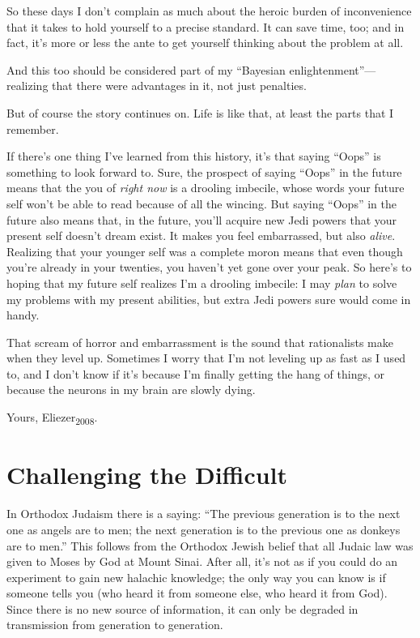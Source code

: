 {
 So these days I don't complain as much about the
heroic burden of inconvenience that it takes to hold yourself to a
precise standard. It can save time, too; and in fact,
it's more or less the ante to get yourself thinking
about the problem at all.}

{
 And this too should be considered part of my
``Bayesian
enlightenment''---realizing that there were
advantages in it, not just penalties.}

{
 But of course the story continues on. Life is like that, at least
the parts that I remember.}

{
 If there's one thing I've learned
from this history, it's that saying
``Oops'' is something to look
forward to. Sure, the prospect of saying
``Oops'' in the future means that
the you of \textit{right now} is a drooling imbecile, whose words your
future self won't be able to read because of all the
wincing. But saying ``Oops'' in the
future also means that, in the future, you'll acquire
new Jedi powers that your present self doesn't dream
exist. It makes you feel embarrassed, but also \textit{alive}.
Realizing that your younger self was a complete moron means that even
though you're already in your twenties, you
haven't yet gone over your peak. So
here's to hoping that my future self realizes
I'm a drooling imbecile: I may \textit{plan} to solve
my problems with my present abilities, but extra Jedi powers sure would
come in handy.}

{
 That scream of horror and embarrassment is the sound that
rationalists make when they level up. Sometimes I worry that
I'm not leveling up as fast as I used to, and I
don't know if it's because
I'm finally getting the hang of things, or because the
neurons in my brain are slowly dying.}

{
 Yours, Eliezer\textsubscript{2008}.}

\myendsectiontext


\bigskip

\chapter{Challenging the Difficult}


{
 In Orthodox Judaism there is a saying: ``The
previous generation is to the next one as angels are to men; the next
generation is to the previous one as donkeys are to
men.'' This follows from the Orthodox Jewish belief
that all Judaic law was given to Moses by God at Mount Sinai. After
all, it's not as if you could do an experiment to gain
new halachic knowledge; the only way you can know is if someone tells
you (who heard it from someone else, who heard it from God). Since
there is no new source of information, it can only be degraded in
transmission from generation to generation. }

